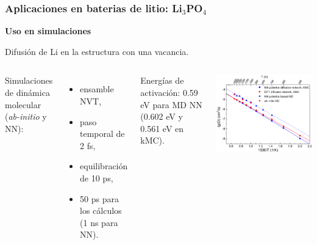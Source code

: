 \documentclass[aspectratio=169]{beamer}
\let\oldtextbf\textbf
\renewcommand{\textbf}[1]{\textcolor{nordblue}{\oldtextbf{#1}}}
\begin{document}
    \begin{frame}
        \frametitle{Aplicaciones en baterias de litio: Li$_3$PO$_4$}
            
        \textbf{Uso en simulaciones}

        Difusión de Li en la estructura con una vacancia.
        
        \begin{columns}
            Simulaciones de dinámica molecular (\textit{ab-initio} y NN):
            \begin{itemize}
                \item ensamble NVT,
                \item paso temporal de 2 fs,
                \item equilibración de 10 ps,
                \item 50 ps para los cálculos (1 ns para NN).
            \end{itemize}

            Energías de activación: 0.59 eV para MD NN (0.602 eV y 0.561 eV en 
            kMC). 
            \begin{center}
                \includegraphics[width=\columnwidth]{Li3PO4-kMC-arrhenius.png}
            \end{center}
        \end{columns}

    \end{frame}
    
\end{document}
